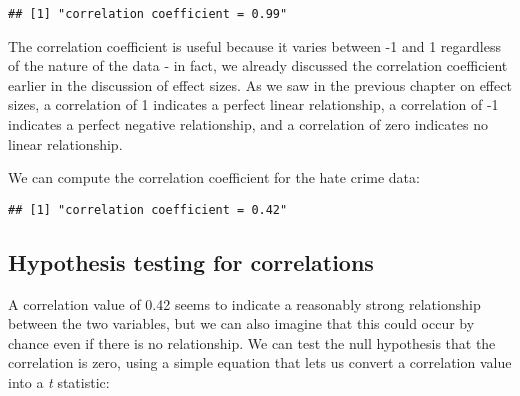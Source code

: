 \documentclass[]{book}
\newenvironment{Shaded}{\begin{snugshade}}{\end{snugshade}}
\newcommand{\KeywordTok}[1]{\textcolor[rgb]{0.13,0.29,0.53}{\textbf{#1}}}
\newcommand{\StringTok}[1]{\textcolor[rgb]{0.31,0.60,0.02}{#1}}
\newcommand{\CommentTok}[1]{\textcolor[rgb]{0.56,0.35,0.01}{\textit{#1}}}
\newcommand{\OperatorTok}[1]{\textcolor[rgb]{0.81,0.36,0.00}{\textbf{#1}}}
\newcommand{\NormalTok}[1]{#1}
\theoremstyle{definition}
\theoremstyle{definition}
\theoremstyle{definition}
\theoremstyle{remark}
\begin{document}
\begin{Shaded}
\end{Shaded}

\begin{verbatim}
## [1] "correlation coefficient = 0.99"
\end{verbatim}

The correlation coefficient is useful because it varies between -1 and 1
regardless of the nature of the data - in fact, we already discussed the
correlation coefficient earlier in the discussion of effect sizes. As we
saw in the previous chapter on effect sizes, a correlation of 1
indicates a perfect linear relationship, a correlation of -1 indicates a
perfect negative relationship, and a correlation of zero indicates no
linear relationship.

We can compute the correlation coefficient for the hate crime data:

\begin{Shaded}
\end{Shaded}

\begin{verbatim}
## [1] "correlation coefficient = 0.42"
\end{verbatim}

\subsection{Hypothesis testing for
correlations}\label{hypothesis-testing-for-correlations}

A correlation value of 0.42 seems to indicate a reasonably strong
relationship between the two variables, but we can also imagine that
this could occur by chance even if there is no relationship. We can test
the null hypothesis that the correlation is zero, using a simple
equation that lets us convert a correlation value into a \emph{t}
statistic:
\end{document}
